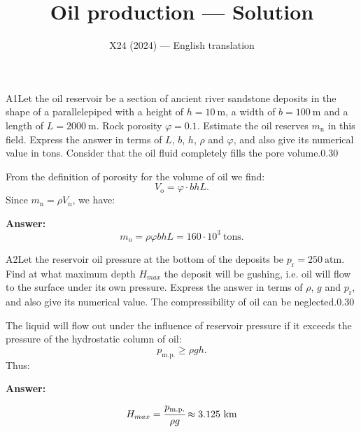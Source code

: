 \documentclass[11pt,a4paper]{article}
\title{\textbf{Oil production --- Solution}}
\author{\normalsize X24 (2024) — English translation}
\date{}
\begin{document}
\maketitle\vspace{-0.5em}
\begin{solcard}{A1}{Let the oil reservoir be a section of ancient river sandstone deposits in the shape of a parallelepiped with a height of $h = 10~\text{m}$, a width of $b = 100~\text{m}$ and a length of $L = 2000~\text{m}$. Rock porosity $\varphi = 0.1$. Estimate the oil reserves $m_\text{n}$ in this field. Express the answer in terms of $L$, $b$, $h$, $\rho$ and $\varphi$, and also give its numerical value in tons. Consider that the oil fluid completely fills the pore volume.}{0.30}

From the definition of porosity for the volume of oil we find: $$V_\text{o}=\varphi\cdot bhL{.} $$Since $m_\text{n}=\rho V_\text{n}$, we have:

\par\smallskip\noindent\textbf{Answer:} $$m_\text{o}=\rho\varphi bhL=160\cdot 10^3~\text{tons}{.} $$
\end{solcard}

\begin{solcard}{A2}{Let the reservoir oil pressure at the bottom of the deposits be $p_\text{r}=250~\text{atm}$. Find at what maximum depth $H_{max}$ the deposit will be gushing, i.e. oil will flow to the surface under its own pressure. Express the answer in terms of $\rho$, $g$ and $p_\text{r}$, and also give its numerical value. The compressibility of oil can be neglected.}{0.30}

The liquid will flow out under the influence of reservoir pressure if it exceeds the pressure of the hydrostatic column of oil: $$p_{\text{m.p.}}\geq \rho gh{.} $$Thus:

\par\smallskip\noindent\textbf{Answer:} $$H_{max}=\cfrac{p_{\text{m.p.}}}{\rho g}\approx 3{.}125~\text{km} $$
\end{solcard}
\end{document}
